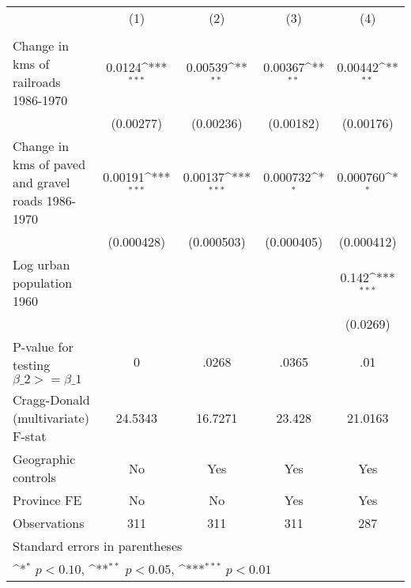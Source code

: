 {
\def\sym#1{\ifmmode^{#1}\else\(^{#1}\)\fi}
\begin{tabular}{l*{4}{c}}
\hline\hline
                &\multicolumn{1}{c}{(1)}&\multicolumn{1}{c}{(2)}&\multicolumn{1}{c}{(3)}&\multicolumn{1}{c}{(4)}\\
                &\multicolumn{1}{c}{}&\multicolumn{1}{c}{}&\multicolumn{1}{c}{}&\multicolumn{1}{c}{}\\
\hline
Change in kms of railroads 1986-1970&   0.0124\sym{***}&  0.00539\sym{**} &  0.00367\sym{**} &  0.00442\sym{**} \\
                &(0.00277)         &(0.00236)         &(0.00182)         &(0.00176)         \\
[1em]
Change in kms of paved and gravel roads 1986-1970&  0.00191\sym{***}&  0.00137\sym{***}& 0.000732\sym{*}  & 0.000760\sym{*}  \\
                &(0.000428)         &(0.000503)         &(0.000405)         &(0.000412)         \\
[1em]
Log urban population 1960&                  &                  &                  &    0.142\sym{***}\\
                &                  &                  &                  & (0.0269)         \\
\hline
P-value for testing $\beta\_{2} >= \beta\_{1}$&        0         &    .0268         &    .0365         &      .01         \\
Cragg-Donald (multivariate) F-stat&  24.5343         &  16.7271         &   23.428         &  21.0163         \\
Geographic controls&       No         &      Yes         &      Yes         &      Yes         \\
Province FE     &       No         &       No         &      Yes         &      Yes         \\
Observations    &      311         &      311         &      311         &      287         \\
\hline\hline
\multicolumn{5}{l}{\footnotesize Standard errors in parentheses}\\
\multicolumn{5}{l}{\footnotesize \sym{*} \(p<0.10\), \sym{**} \(p<0.05\), \sym{***} \(p<0.01\)}\\
\end{tabular}
}
